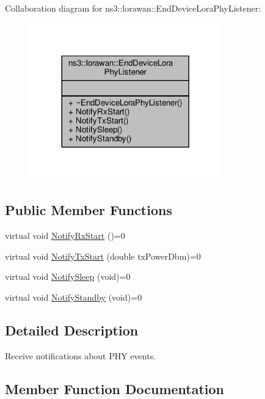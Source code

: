 Collaboration diagram for ns3\+:\+:lorawan\+:\+:End\+Device\+Lora\+Phy\+Listener\+:
\nopagebreak
\begin{figure}[H]
\begin{center}
\leavevmode
\includegraphics[width=236pt]{classns3_1_1lorawan_1_1EndDeviceLoraPhyListener__coll__graph}
\end{center}
\end{figure}
\subsection*{Public Member Functions}
\begin{DoxyCompactItemize}
\item 
virtual void \hyperlink{classns3_1_1lorawan_1_1EndDeviceLoraPhyListener_acb82563f9dc6082e442c0ec6b1d32d94}{Notify\+Rx\+Start} ()=0
\item 
virtual void \hyperlink{classns3_1_1lorawan_1_1EndDeviceLoraPhyListener_abf3943484dc182ade9f180cd806d43f4}{Notify\+Tx\+Start} (double tx\+Power\+Dbm)=0
\item 
virtual void \hyperlink{classns3_1_1lorawan_1_1EndDeviceLoraPhyListener_a0e9d774b67cbddee98c5f7d76c844c65}{Notify\+Sleep} (void)=0
\item 
virtual void \hyperlink{classns3_1_1lorawan_1_1EndDeviceLoraPhyListener_ab7e6540205cc6a0cefbe226bda967187}{Notify\+Standby} (void)=0
\end{DoxyCompactItemize}


\subsection{Detailed Description}
Receive notifications about P\+HY events. 

\subsection{Member Function Documentation}
\mbox{\label{classns3_1_1lorawan_1_1EndDeviceLoraPhyListener_acb82563f9dc6082e442c0ec6b1d32d94}} 
